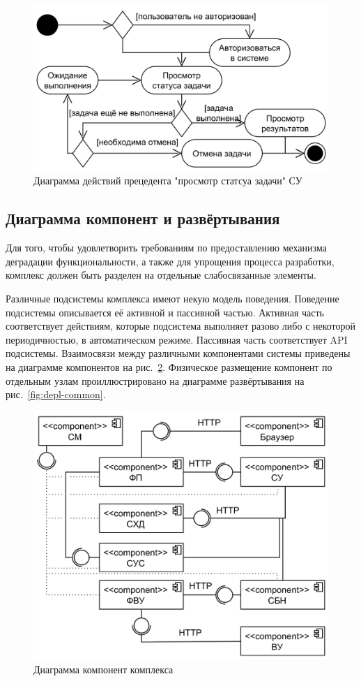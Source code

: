 \documentclass[a4paper,12pt]{report}
\numberwithin{equation}{section}
\begin{document}
\begin{figure}
  \centering
  \includegraphics[width=\linewidth]{../diagrams/logic/activity-view}
  \caption{Диаграмма действий прецедента "просмотр статсуа задачи" СУ}
  \label{fig:logic-view}
\end{figure}

\subsection{Диаграмма компонент и развёртывания}
Для того, чтобы удовлетворить требованиям по предоставлению механизма деградации функциональности,
а также для упрощения процесса разработки, комплекс должен быть разделен на отдельные слабосвязанные элементы.

Различные подсистемы комплекса имеют некую модель поведения.
Поведение подсистемы описывается её активной и пассивной частью.
Активная часть соответствует действиям, которые подсистема выполняет разово либо с некоторой периодичностью, в автоматическом режиме.
Пассивная часть соответствует API подсистемы.
Взаимосвязи между различными компонентами системы приведены на диаграмме компонентов на рис.~\ref{fig:comp-common}.
Физическое размещение компонент по отдельным узлам проиллюстрировано на диаграмме развёртывания на рис.~\ref{fig:depl-common}.

\begin{figure}[b]
  \centering
  \includegraphics[width=.7\linewidth]{../diagrams/common/component}
  \caption{Диаграмма компонент комплекса}
  \label{fig:comp-common}
\end{figure}
\end{document}
